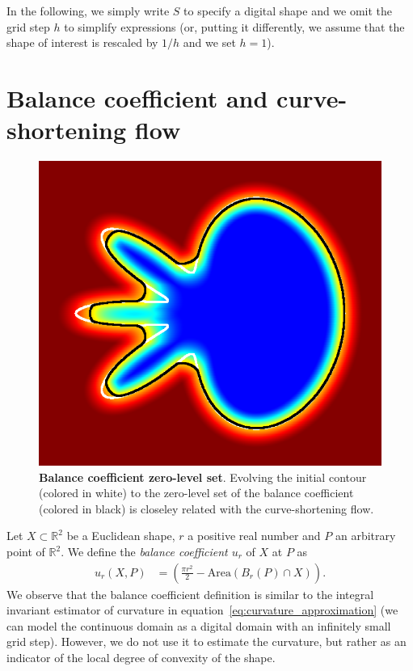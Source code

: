 \documentclass[review]{siamart220329}
\newcommand{\R}{\mathbb{R}}
\begin{document}
In the following, we simply write $S$ to specify a digital shape and we omit the grid step $h$ to simplify expressions (or, putting it differently, we assume that the shape of interest is rescaled by $1/h$ and we set $h = 1$).
%
%
%
%
%
\section{Balance coefficient and curve-shortening flow}
%
%
\begin{figure}
 \center
 \includegraphics[scale=0.32]{figures/zero-level-set/balance-coefficient-zero-level-set.png}
 \caption{\textbf{Balance coefficient zero-level set}. Evolving the initial contour (colored in white) to the zero-level set of the balance coefficient (colored in black) is closeley related with the curve-shortening flow.}
 \label{fig:balance-coefficient-zero-level-set}
 \end{figure}
%
%
Let $X \subset \R^2$ be a Euclidean shape, $r$ a positive real number and $P$ an arbitrary point of $\R^2$. We define the \emph{balance coefficient $u_r$} of $X$ at $P$ as
%
%
\begin{align*}
  u_r(X,P) &= \left( \frac{\pi r^2}{2} - \text{Area}(B_r(P) \cap X) \right).
\end{align*}
%
%
We observe that the balance coefficient definition is similar to the
integral invariant estimator of curvature in
equation~\eqref{eq:curvature_approximation} (we can model the
continuous domain as a digital domain with an infinitely small grid
step). However, we do not use it to estimate the curvature, but rather
as an indicator of the local degree of convexity of the shape.
\end{document}
